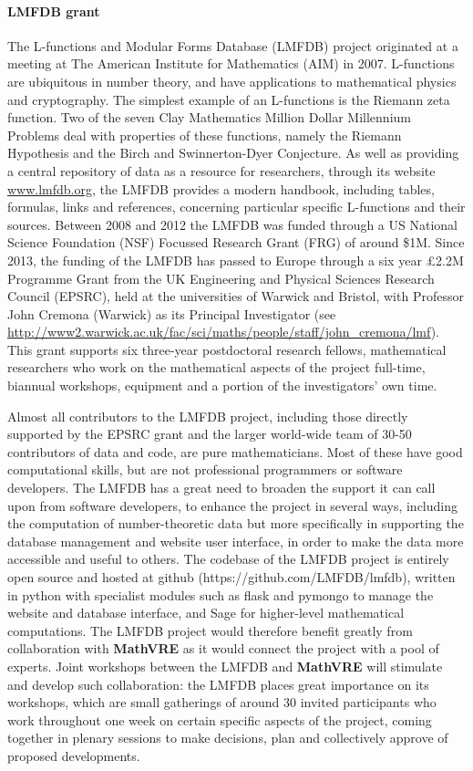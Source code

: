 \documentclass[a4paper,11pt]{article}
\newcommand{\XX}{\textbf{MathVRE}\xspace}
\newcommand{\TheProject}{\XX}
\begin{document}
\paragraph{LMFDB grant}

The L-functions and Modular Forms Database (LMFDB) project originated
at a meeting at The American Institute for Mathematics (AIM) in 2007.
L-functions are ubiquitous in number theory, and have applications to
mathematical physics and cryptography. The simplest example of an
L-functions is the Riemann zeta function. Two of the seven Clay
Mathematics Million Dollar Millennium Problems deal with properties of
these functions, namely the Riemann Hypothesis and the Birch and
Swinnerton-Dyer Conjecture.  As well as providing a central repository
of data as a resource for researchers, through its website
\url{www.lmfdb.org}, the LMFDB provides a modern handbook, including
tables, formulas, links and references, concerning particular specific
L-functions and their sources.  Between 2008 and 2012 the LMFDB was
funded through a US National Science Foundation (NSF) Focussed
Research Grant (FRG) of around \$1M.  Since 2013, the funding of the
LMFDB has passed to Europe through a six year £2.2M Programme Grant
from the UK Engineering and Physical Sciences Research Council
(EPSRC), held at the universities of Warwick and Bristol, with
Professor John Cremona (Warwick) as its Principal Investigator (see
\url{http://www2.warwick.ac.uk/fac/sci/maths/people/staff/john_cremona/lmf}).
This grant supports six three-year postdoctoral research fellows,
mathematical researchers who work on the mathematical aspects of the
project full-time, biannual workshops, equipment and a portion of the
investigators' own time.

Almost all contributors to the LMFDB project, including those directly
supported by the EPSRC grant and the larger world-wide team of 30-50
contributors of data and code, are pure mathematicians.  Most of these
have good computational skills, but are not professional programmers
or software developers.  The LMFDB has a great need to broaden the
support it can call upon from software developers, to enhance the
project in several ways, including the computation of number-theoretic
data but more specifically in supporting the database management and
website user interface, in order to make the data more accessible and
useful to others.  The codebase of the LMFDB project is entirely open
source and hosted at github (https://github.com/LMFDB/lmfdb), written
in python with specialist modules such as flask and pymongo to manage
the website and database interface, and Sage for higher-level
mathematical computations.  The LMFDB project would therefore benefit
greatly from collaboration with \TheProject as it would
connect the project with a pool of experts.  Joint workshops between
the LMFDB and \TheProject will stimulate and develop such
collaboration: the LMFDB places great importance on its workshops,
which are small gatherings of around 30 invited participants who work
throughout one week on certain specific aspects of the project, coming
together in plenary sessions to make decisions, plan and collectively
approve of proposed developments.
\end{document}
